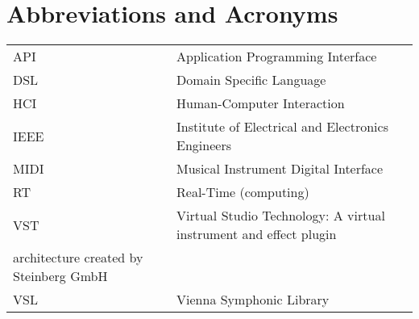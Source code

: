 \chapter*{Abbreviations and Acronyms}


\noindent
\begin{longtable}{@{}p{}p{}@{}}
API & Application Programming Interface \\
DSL & Domain Specific Language \\
HCI & Human-Computer Interaction \\
IEEE & Institute of Electrical and Electronics Engineers \\
MIDI & Musical Instrument Digital Interface \\
RT & Real-Time (computing) \\
VST & Virtual Studio Technology: A virtual instrument and effect plugin \\ architecture created by Steinberg GmbH \\
VSL & Vienna Symphonic Library

\end{longtable}
